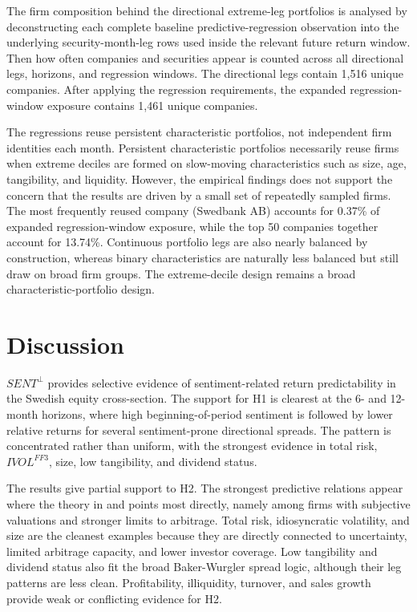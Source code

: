 \documentclass[11pt]{article}
\newcommand{\var}[1]{\ensuremath{#1}}
\begin{document}
The firm composition behind the directional extreme-leg portfolios is analysed by deconstructing each complete baseline predictive-regression observation into the underlying security-month-leg rows used inside the relevant future return window. Then how often companies and securities appear is counted across all directional legs, horizons, and regression windows. The directional legs contain 1,516 unique companies. After applying the regression requirements, the expanded regression-window exposure contains 1,461 unique companies.

The regressions reuse persistent characteristic portfolios, not independent firm identities each month. Persistent characteristic portfolios necessarily reuse firms when extreme deciles are formed on slow-moving characteristics such as size, age, tangibility, and liquidity. However, the empirical findings does not support the concern that the results are driven by a small set of repeatedly sampled firms. The most frequently reused company (Swedbank AB) accounts for 0.37\% of expanded regression-window exposure, while the top 50 companies together account for 13.74\%. Continuous portfolio legs are also nearly balanced by construction, whereas binary characteristics are naturally less balanced but still draw on broad firm groups. The extreme-decile design remains a broad characteristic-portfolio design.

\section{Discussion}
\var{SENT^{\perp}} provides selective evidence of sentiment-related return predictability in the Swedish equity cross-section. The support for H1 is clearest at the 6- and 12-month horizons, where high beginning-of-period sentiment is followed by lower relative returns for several sentiment-prone directional spreads. The pattern is concentrated rather than uniform, with the strongest evidence in total risk, \var{IVOL^{FF3}}, size, low tangibility, and dividend status.

The results give partial support to H2. The strongest predictive relations appear where the theory in \citet{baker2006sentiment} and \citet{baker2007} points most directly, namely among firms with subjective valuations and stronger limits to arbitrage. Total risk, idiosyncratic volatility, and size are the cleanest examples because they are directly connected to uncertainty, limited arbitrage capacity, and lower investor coverage. Low tangibility and dividend status also fit the broad Baker-Wurgler spread logic, although their leg patterns are less clean. Profitability, illiquidity, turnover, and sales growth provide weak or conflicting evidence for H2. 
\end{document}
